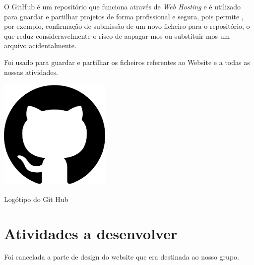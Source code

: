 \documentclass[11pt]{report}
\begin{document}
\centering
\begin{minipage}{.45\linewidth}
	O GitHub é um repositório que funciona através de \textit{Web Hosting} e é utilizado para guardar e partilhar projetos de forma profissional e segura, pois permite  , por exemplo, confirmação de submissão de um novo ficheiro para o repositório, o que reduz consideravelmente o risco de aapagar-mos ou substituir-mos um arquivo acidentalmente.
	
	Foi usado para guardar e partilhar os ficheiros referentes ao Website e a todas as nossas atividades.\\
\end{minipage}
\hspace{.15\linewidth}
\begin{minipage}{.20\linewidth}
  \includegraphics[width=\linewidth]{Git.png}
  \caption{Logótipo do Git Hub}
  \label{img6}
\end{minipage}



\newpage
\section{Atividades a desenvolver}
Foi cancelada a parte de design do website que era destinada ao nosso grupo.
\end{document}
